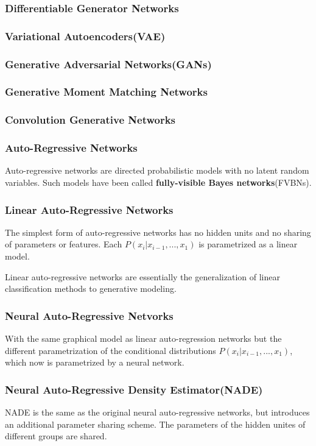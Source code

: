 \documentclass[12pt]{article}
\numberwithin{equation}{section}
\begin{document}
\subsubsection{Differentiable Generator Networks}
\subsubsection{Variational Autoencoders(VAE)}
\subsubsection{Generative Adversarial Networks(GANs)}
\subsubsection{Generative Moment Matching Networks}
\subsubsection{Convolution Generative Networks}
\subsubsection{Auto-Regressive Networks}
	Auto-regressive networks are directed probabilistic models with no latent random variables. Such models have been called \textbf{fully-visible Bayes networks}(FVBNs).\par
\subsubsection{Linear Auto-Regressive Networks}
	The simplest form of auto-regressive networks has no hidden units and no sharing of parameters or features. Each $P(x_i|x_{i-1},...,x_1)$ is parametrized as a linear model. \par
	Linear auto-regressive networks are essentially the generalization of linear classification methods to generative modeling. \par
\subsubsection{Neural Auto-Regressive Netvorks}
	With the same graphical model as linear auto-regression networks but the different parametrization of the conditional distributions $P(x_i|x_{i-1},...,x_1)$, which now is parametrized by a neural network. \par
\subsubsection{Neural Auto-Regressive Density Estimator(NADE)}
	NADE is the same as the original neural auto-regressive networks, but introduces an additional parameter sharing scheme. The parameters of the hidden unites of different groups are shared.\par
\end{document}

